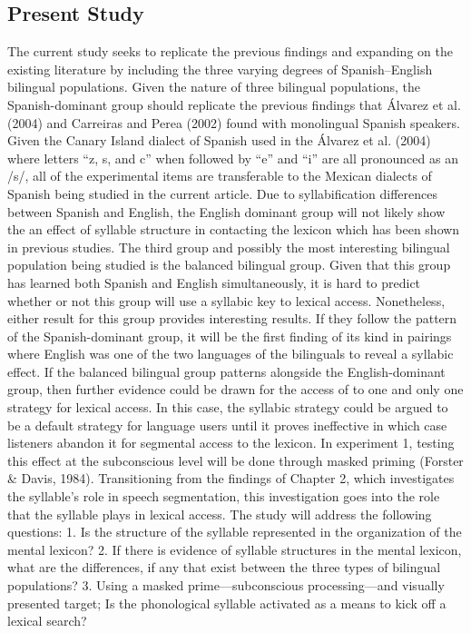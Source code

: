 \subsection{Present Study}
The current study seeks to replicate the previous findings and expanding on the existing literature by including the three varying degrees of Spanish–English bilingual populations. Given the nature of three bilingual populations, the Spanish-dominant group should replicate the previous findings that Álvarez et al. (2004) and Carreiras and Perea (2002) found with monolingual Spanish speakers. Given the Canary Island dialect of Spanish used in the Álvarez et al. (2004) where letters “z, s, and c” when followed by “e” and “i” are all pronounced as an /s/, all of the experimental items are transferable to the Mexican dialects of Spanish being studied in the current article. Due to syllabification differences between Spanish and English, the English dominant group will not likely show the an effect of syllable structure in contacting the lexicon which has been shown in previous studies. The third group and possibly the most interesting bilingual population being studied is the balanced bilingual group. Given that this group has learned both Spanish and English simultaneously, it is hard to predict whether or not this group will use a syllabic key to lexical access. Nonetheless, either result for this group provides interesting results. If they follow the pattern of the Spanish-dominant group, it will be the first finding of its kind in pairings where English was one of the two languages of the bilinguals to reveal a syllabic effect. If the balanced bilingual group patterns alongside the English-dominant group, then further evidence could be drawn for the access of to one and only one strategy for lexical access. In this case, the syllabic strategy could be argued to be a default strategy for language users until it proves ineffective in which case listeners abandon it for segmental access to the lexicon. In experiment 1, testing this effect at the subconscious level will be done through masked priming (Forster \& Davis, 1984). 
Transitioning from the findings of Chapter 2, which investigates the syllable’s role in speech segmentation, this investigation goes into the role that the syllable plays in lexical access. The study will address the following questions:
1.	Is the structure of the syllable represented in the organization of the mental lexicon?
2.	If there is evidence of syllable structures in the mental lexicon, what are the differences, if any that exist between the three types of bilingual populations?
3.	Using a masked prime—subconscious processing—and visually presented target; Is the phonological syllable activated as a means to kick off a lexical search?

